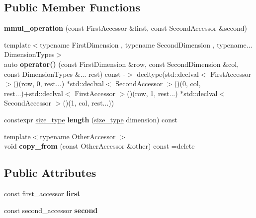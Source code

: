 \subsection*{Public Member Functions}
\begin{DoxyCompactItemize}
\item 
\mbox{\label{structgko_1_1accessor_1_1mmul__operation_a472e957cd98afc95ca3d4d3c7addb0f7}} 
{\bfseries mmul\+\_\+operation} (const First\+Accessor \&first, const Second\+Accessor \&second)
\item 
\mbox{\label{structgko_1_1accessor_1_1mmul__operation_a89afaa8ad55103c4c62416e9361c7a23}} 
{\footnotesize template$<$typename First\+Dimension , typename Second\+Dimension , typename... Dimension\+Types$>$ }\\auto {\bfseries operator()} (const First\+Dimension \&row, const Second\+Dimension \&col, const Dimension\+Types \&... rest) const -\/$>$ decltype(std\+::declval$<$ First\+Accessor $>$()(row, 0, rest...) $\ast$std\+::declval$<$ Second\+Accessor $>$()(0, col, rest...)+std\+::declval$<$ First\+Accessor $>$()(row, 1, rest...) $\ast$std\+::declval$<$ Second\+Accessor $>$()(1, col, rest...))
\item 
\mbox{\label{structgko_1_1accessor_1_1mmul__operation_a4e776fd888efc17b80b1f87ac49d2818}} 
constexpr \hyperlink{namespacegko_a6e5c95df0ae4e47aab2f604a22d98ee7}{size\+\_\+type} {\bfseries length} (\hyperlink{namespacegko_a6e5c95df0ae4e47aab2f604a22d98ee7}{size\+\_\+type} dimension) const
\item 
\mbox{\label{structgko_1_1accessor_1_1mmul__operation_a690fcc7b846e13fe5df655c4c5b90e80}} 
{\footnotesize template$<$typename Other\+Accessor $>$ }\\void {\bfseries copy\+\_\+from} (const Other\+Accessor \&other) const =delete
\end{DoxyCompactItemize}
\subsection*{Public Attributes}
\begin{DoxyCompactItemize}
\item 
\mbox{\label{structgko_1_1accessor_1_1mmul__operation_ab176f057bb44eb0a5cb7711c55aa39bc}} 
const first\+\_\+accessor {\bfseries first}
\item 
\mbox{\label{structgko_1_1accessor_1_1mmul__operation_a91e83e9e0ae033f697f52d2a1ae4a6a5}} 
const second\+\_\+accessor {\bfseries second}
\end{DoxyCompactItemize}
